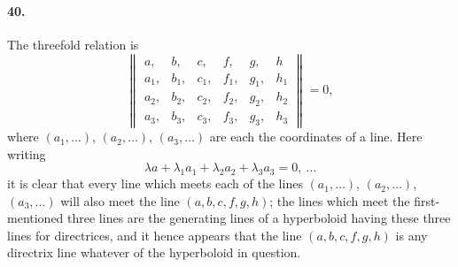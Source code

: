 \documentclass[11pt,a4paper]{article}
\begin{document}
\paragraph{40.}
The threefold relation is
\[
\begin{Vmatrix}
a, & b, & c, & f, & g, & h \\
a_1, & b_1, & c_1, & f_1, & g_1, & h_1 \\
a_2, & b_2, & c_2, & f_2, & g_2, & h_2 \\
a_3, & b_3, & c_3, & f_3, & g_3, & h_3
\end{Vmatrix} = 0,
\]
where $(a_1, \ldots)$, $(a_2, \ldots)$, $(a_3, \ldots)$ are each the coordinates of a line. Here writing
\[
\lambda a + \lambda_1 a_1 + \lambda_2 a_2 + \lambda_3 a_3 = 0,\ \ldots
\]
it is clear that every line which meets each of the lines $(a_1, \ldots)$, $(a_2, \ldots)$,
$(a_3, \ldots)$ will also meet the line $(a,b,c,f,g,h)$; the lines which meet the
first-mentioned three lines are the generating lines of a hyperboloid having these three
lines for directrices, and it hence appears that the line $(a,b,c,f,g,h)$ is any
directrix line whatever of the hyperboloid in question.
\end{document}

